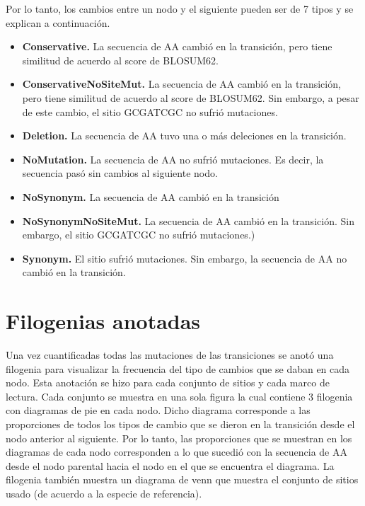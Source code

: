 \documentclass[
]{book}
\begin{document}
Por lo tanto, los cambios entre un nodo y el siguiente pueden ser de 7 tipos y se explican a continuación.

\begin{itemize}
\item
  \textbf{Conservative.} La secuencia de AA cambió en la transición, pero tiene similitud de acuerdo al score de BLOSUM62.
\item
  \textbf{ConservativeNoSiteMut.} La secuencia de AA cambió en la transición, pero tiene similitud de acuerdo al score de BLOSUM62. Sin embargo, a pesar de este cambio, el sitio GCGATCGC no sufrió mutaciones.
\item
  \textbf{Deletion.} La secuencia de AA tuvo una o más deleciones en la transición.
\item
  \textbf{NoMutation.} La secuencia de AA no sufrió mutaciones. Es decir, la secuencia pasó sin cambios al siguiente nodo.
\item
  \textbf{NoSynonym.} La secuencia de AA cambió en la transición
\item
  \textbf{NoSynonymNoSiteMut.} La secuencia de AA cambió en la transición. Sin embargo, el sitio GCGATCGC no sufrió mutaciones.)
\item
  \textbf{Synonym.} El sitio sufrió mutaciones. Sin embargo, la secuencia de AA no cambió en la transición.
\end{itemize}

\hypertarget{filogenias-anotadas}{%
\section{Filogenias anotadas}\label{filogenias-anotadas}}

Una vez cuantificadas todas las mutaciones de las transiciones se anotó una filogenia para visualizar la frecuencia del tipo de cambios que se daban en cada nodo. Esta anotación se hizo para cada conjunto de sitios y cada marco de lectura. Cada conjunto se muestra en una sola figura la cual contiene 3 filogenia con diagramas de pie en cada nodo. Dicho diagrama corresponde a las proporciones de todos los tipos de cambio que se dieron en la transición desde el nodo anterior al siguiente. Por lo tanto, las proporciones que se muestran en los diagramas de cada nodo corresponden a lo que sucedió con la secuencia de AA desde el nodo parental hacia el nodo en el que se encuentra el diagrama. La filogenia también muestra un diagrama de venn que muestra el conjunto de sitios usado (de acuerdo a la especie de referencia).
\end{document}
